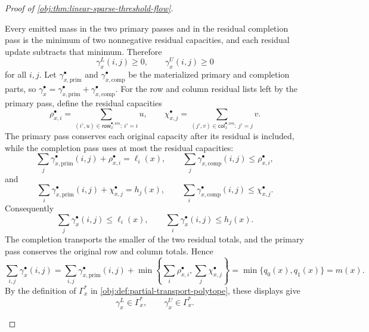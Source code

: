 \documentclass[11pt]{article}
\begin{document}
\begin{proof}[Proof of \cref{obj:thm:linear-sparse-threshold-flow}]
\begin{enumerate}
Every emitted mass in the two primary passes and in the residual completion pass is the minimum of two nonnegative residual capacities, and each residual update subtracts that minimum.  Therefore
\[
\gamma_x^L(i,j)\ge0,
\qquad
\gamma_x^U(i,j)\ge0
\]
for all \(i,j\).  Let \(\gamma_{x,\mathrm{prim}}^\bullet\) and \(\gamma_{x,\mathrm{comp}}^\bullet\) be the materialized primary and completion parts, so \(\gamma_x^\bullet=\gamma_{x,\mathrm{prim}}^\bullet+\gamma_{x,\mathrm{comp}}^\bullet\).  For the row and column residual lists left by the primary pass, define the residual capacities
\[
\rho_{x,i}^\bullet
=
\sum_{(i',u)\in\mathsf{row}_{x}^{\bullet,\mathrm{res}}:\ i'=i}u,
\qquad
\chi_{x,j}^\bullet
=
\sum_{(j',v)\in\mathsf{col}_{x}^{\bullet,\mathrm{res}}:\ j'=j}v .
\]
The primary pass conserves each original capacity after its residual is included, while the completion pass uses at most the residual capacities:
\[
\sum_j\gamma_{x,\mathrm{prim}}^\bullet(i,j)+\rho_{x,i}^\bullet=\ell_i(x),
\qquad
\sum_j\gamma_{x,\mathrm{comp}}^\bullet(i,j)\le \rho_{x,i}^\bullet,
\]
and
\[
\sum_i\gamma_{x,\mathrm{prim}}^\bullet(i,j)+\chi_{x,j}^\bullet=h_j(x),
\qquad
\sum_i\gamma_{x,\mathrm{comp}}^\bullet(i,j)\le \chi_{x,j}^\bullet.
\]
Consequently
\[
\sum_j\gamma_x^\bullet(i,j)\le\ell_i(x),
\qquad
\sum_i\gamma_x^\bullet(i,j)\le h_j(x).
\]
The completion transports the smaller of the two residual totals, and the primary pass conserves the original row and column totals.  Hence
\[
\sum_{i,j}\gamma_x^\bullet(i,j)
=
\sum_{i,j}\gamma_{x,\mathrm{prim}}^\bullet(i,j)
+\min\left\{\sum_i\rho_{x,i}^\bullet,\sum_j\chi_{x,j}^\bullet\right\}
=\min\{q_0(x),q_1(x)\}=m(x).
\]
By the definition of \(\Gamma_x^\ast\) in \cref{obj:def:partial-transport-polytope}, these displays give
\[
\gamma_x^L\in\Gamma_x^\ast,
\qquad
\gamma_x^U\in\Gamma_x^\ast.
\]


\end{enumerate}
\end{proof}
\end{document}
